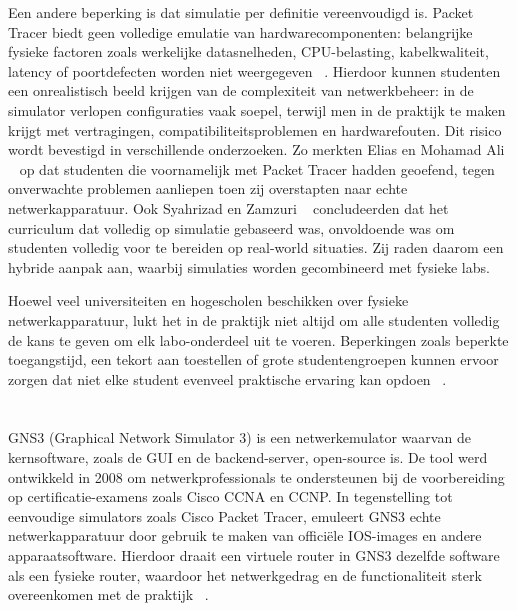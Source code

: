 Een andere beperking is dat simulatie per definitie vereenvoudigd is. Packet Tracer biedt geen volledige emulatie van hardwarecomponenten: belangrijke fysieke factoren zoals werkelijke datasnelheden, CPU-belasting, kabelkwaliteit, latency of poortdefecten worden niet weergegeven ~\autocite{Hashimi2017}. Hierdoor kunnen studenten een onrealistisch beeld krijgen van de complexiteit van netwerkbeheer: in de simulator verlopen configuraties vaak soepel, terwijl men in de praktijk te maken krijgt met vertragingen, compatibiliteitsproblemen en hardwarefouten. Dit risico wordt bevestigd in verschillende onderzoeken. Zo merkten Elias en Mohamad Ali ~\autocite{Elias2014} op dat studenten die voornamelijk met Packet Tracer hadden geoefend, tegen onverwachte problemen aanliepen toen zij overstapten naar echte netwerkapparatuur. Ook Syahrizad en Zamzuri ~\autocite{Elias2014} concludeerden dat het curriculum dat volledig op simulatie gebaseerd was, onvoldoende was om studenten volledig voor te bereiden op real-world situaties. Zij raden daarom een hybride aanpak aan, waarbij simulaties worden gecombineerd met fysieke labs.

\vspace{0.3cm}

Hoewel veel universiteiten en hogescholen beschikken over fysieke netwerkapparatuur, lukt het in de praktijk niet altijd om alle studenten volledig de kans te geven om elk labo-onderdeel uit te voeren. Beperkingen zoals beperkte toegangstijd, een tekort aan toestellen of grote studentengroepen kunnen ervoor zorgen dat niet elke student evenveel praktische ervaring kan opdoen ~\autocite{inproceedings}.




\section{}%
\label{sec:GNS3}

GNS3 (Graphical Network Simulator 3) is een netwerkemulator waarvan de kernsoftware, zoals de GUI en de backend-server, open-source is. De tool werd ontwikkeld in 2008 om netwerkprofessionals te ondersteunen bij de voorbereiding op certificatie-examens zoals Cisco CCNA en CCNP. In tegenstelling tot eenvoudige simulators zoals Cisco Packet Tracer, emuleert GNS3 echte netwerkapparatuur door gebruik te maken van officiële IOS-images en andere apparaatsoftware. Hierdoor draait een virtuele router in GNS3 dezelfde software als een fysieke router, waardoor het netwerkgedrag en de functionaliteit sterk overeenkomen met de praktijk ~\autocite{Kuzmenko2016}.

